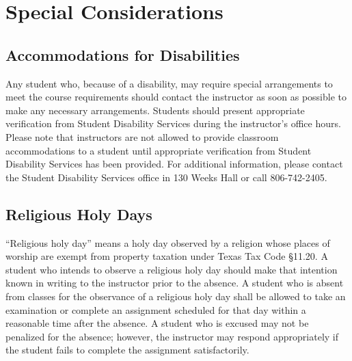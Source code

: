 \documentclass[12pt, notitlepage]{article}   	%
\begin{document}
{\section{Special Considerations}
\subsection{Accommodations for Disabilities}
Any student who, because of a disability, may require special arrangements to meet the 
course requirements should contact the instructor as soon as possible to make any 
necessary arrangements. 
Students should present appropriate verification from Student Disability Services 
during the instructor’s office hours. 
Please note that instructors are not allowed to provide classroom accommodations 
to a student until appropriate verification from Student Disability Services has been provided. 
For additional information, please contact the Student Disability Services office in 130 
Weeks Hall or call 806-742-2405.

\subsection{Religious Holy Days}
“Religious holy day” means a holy day observed by a religion whose places of worship 
are exempt from property taxation under Texas Tax Code §11.20. 
A student who intends to observe a religious holy day should make that intention known 
in writing to the instructor prior to the absence. 
A student who is absent from classes for the observance of a religious holy day shall be 
allowed to take an examination or complete an assignment scheduled for that day within a 
reasonable time after the absence. 
A student who is excused may not be penalized for the absence; however, the instructor 
may respond appropriately if the student fails to complete the assignment satisfactorily.

}
\end{document}

